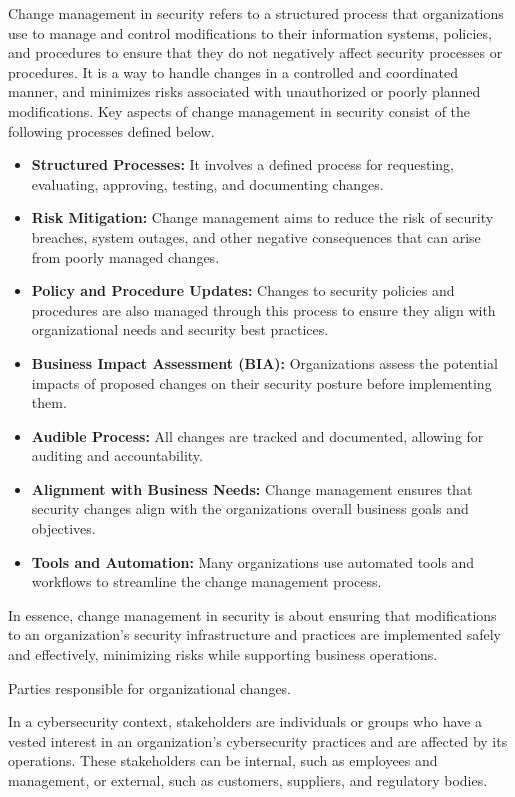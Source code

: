  Change management in security refers to a structured process that organizations use to manage and control modifications to their information systems, policies, and procedures to ensure that they do not negatively affect security processes or procedures. It is a way to handle changes in a controlled and coordinated manner, and minimizes risks associated with unauthorized or poorly planned modifications.
Key aspects of change management in security consist of the following processes defined below.
\begin{itemize}
    \item \textbf{Structured Processes:} It involves a defined process for requesting, evaluating, approving, testing, and documenting changes.
    \item \textbf{Risk Mitigation:} Change management aims to reduce the risk of security breaches, system outages, and other negative consequences that can arise from poorly managed changes.
    \item \textbf{Policy and Procedure Updates:} Changes to security policies and procedures are also managed through this process to ensure they align with organizational needs and security best practices.
    \item \textbf{Business Impact Assessment (BIA):} Organizations assess the potential impacts of proposed changes on their security posture before implementing them.
    \item \textbf{Audible Process:} All changes are tracked and documented, allowing for auditing and accountability.
    \item \textbf{Alignment with Business Needs:} Change management ensures that security changes align with the organizations overall business goals and objectives.
    \item \textbf{Tools and Automation:} Many organizations use automated tools and workflows to streamline the change management process.
\end{itemize}
In essence, change management in security is about ensuring that modifications to an organization's security infrastructure and practices are implemented safely and effectively, minimizing risks while supporting business operations.

 Parties responsible for organizational changes.

 In a cybersecurity context, stakeholders are individuals or groups who have a vested interest in an organization's cybersecurity practices and are affected by its operations. These stakeholders can be internal, such as employees and management, or external, such as customers, suppliers, and regulatory bodies.

